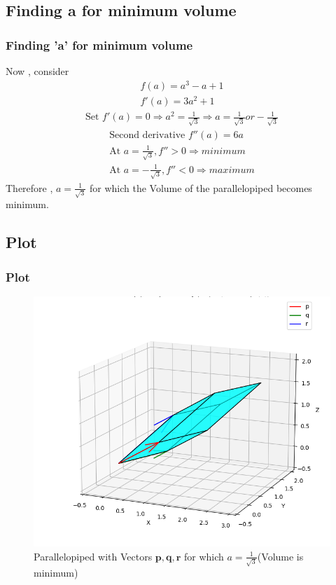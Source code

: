 \documentclass{beamer}
\theoremstyle{remark}
\let\vec\mathbf
\numberwithin{equation}{section}
\begin{document}
\subsection{Finding a for minimum volume}
\begin{frame}[fragile]
\frametitle{Finding 'a' for minimum volume}
    Now , consider
\begin{align}
    f(a)=a^3-a+1\\
    f'(a)=3a^2+1
\end{align}
\begin{align*}
\text{Set }f'(a)=0  \Rightarrow a^2=\frac{1}{\sqrt{3}} \Rightarrow a=\frac{1}{\sqrt{3}} or -\frac{1}{\sqrt{3}} 
\end{align*}
\begin{align}
\text{Second derivative }f''(a)=6a\\
\text{At }a=\frac{1}{\sqrt{3}},f''>0 \Rightarrow minimum\\
\text{At }a=-\frac{1}{\sqrt{3}},f''<0 \Rightarrow maximum
\end{align}
Therefore , $a=\frac{1}{\sqrt{3}}$ for which the Volume of the parallelopiped becomes minimum.
\end{frame}
\subsection{Plot}
\begin{frame}[fragile]
\frametitle{Plot}

\begin{figure}[h!]
   \centering
   \includegraphics[width=0.7\columnwidth]{figs/fig.png}
	\caption{Parallelopiped with Vectors $\vec{p},\vec{q},\vec{r}$ for which $a=\frac{1}{\sqrt{3}}$(Volume is minimum)}
    \label{}
\end{figure}
\end{frame}
\end{document}
